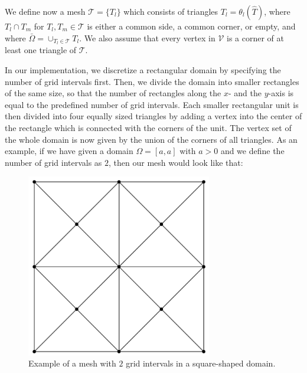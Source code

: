 We define now a mesh $\mathcal{T}=\{T_l\}$ which consists of triangles $T_l=\theta_l(\hat{T})$, where $T_l\cap T_m$ for $T_l,T_m\in\mathcal{T}$ is either a common side, a common corner, or empty, and where $\bar{\Omega}=\cup_{T_l\in\mathcal{T}}T_l$. We also assume that every vertex in $\mathcal{V}$ is a corner of at least one triangle of $\mathcal{T}$.

In our implementation, we discretize a rectangular domain by specifying the number of grid intervals first. Then, we divide the domain into smaller rectangles of the same size, so that the number of rectangles along the $x$- and the $y$-axis is equal to the predefined number of grid intervals. Each smaller rectangular unit is then divided into four equally sized triangles by adding a vertex into the center of the rectangle which is connected with the corners of the unit. The vertex set of the whole domain is now given by the union of the corners of all triangles. As an example, if we have given a domain $\Omega = [a, a]$ with $a>0$ and we define the number of grid intervals as $2$, then our mesh would look like that:
\begin{figure}
    \centering
    \includegraphics[height=8cm]{mesh.png} 
    \caption{Example of a mesh with $2$ grid intervals in a square-shaped domain.}
\end{figure}

